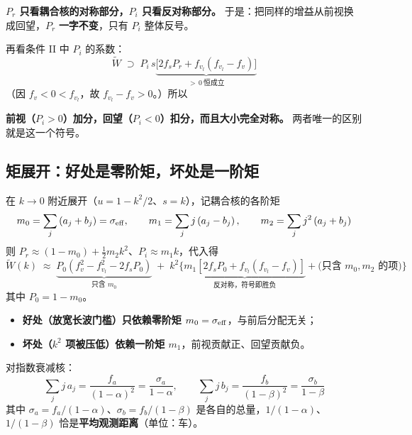 \documentclass[11pt,a4paper,openany]{book}
\numberwithin{equation}{chapter}
\numberwithin{figure}{chapter}
\numberwithin{table}{chapter}
\begin{document}
\textbf{$P_r$ 只看耦合核的对称部分，$P_i$ 只看反对称部分。} 于是：把同样的增益从前视换成回望，$P_r$ \textbf{一字不变}，只有 $P_i$ 整体反号。

再看条件 II 中 $P_i$ 的系数：
\begin{equation}
\widetilde W \;\supset\; P_i\,s\underbrace{\Big[2f_sP_r + f_{v_l}\left(f_{v_l}-f_v\right)\Big]}_{\textstyle >\,0\ \text{恒成立}}
\end{equation}
（因 $f_v<0<f_{v_l}$，故 $f_{v_l}-f_v>0$。）所以

\begin{tcolorbox}[notebox]
\textbf{前视（$P_i>0$）加分，回望（$P_i<0$）扣分，而且大小完全对称。} 两者唯一的区别就是这一个符号。
\end{tcolorbox}

\subsection{矩展开：好处是零阶矩，坏处是一阶矩}

在 $k\to0$ 附近展开（$u=1-k^2/2$、$s=k$），记耦合核的各阶矩
\begin{equation}
m_0 = \sum_j\left(a_j+b_j\right) = \sigma_{\rm eff},
\qquad
m_1 = \sum_j j\left(a_j-b_j\right),
\qquad
m_2 = \sum_j j^2\left(a_j+b_j\right)
\end{equation}
则 $P_r \approx \left(1-m_0\right) + \tfrac12 m_2k^2$、$P_i\approx m_1k$，代入得
\begin{equation}
\widetilde W(k) \;\approx\; \underbrace{P_0\left(f_v^2-f_{v_l}^2-2f_sP_0\right)}_{\text{只含 }m_0}
\;+\; k^2\Big\{\underbrace{m_1\left[2f_sP_0+f_{v_l}\left(f_{v_l}-f_v\right)\right]}_{\text{反对称，符号即胜负}} + \big(\text{只含 }m_0,m_2\text{ 的项}\big)\Big\}
\end{equation}
其中 $P_0=1-m_0$。

\begin{tcolorbox}[keybox,title=\textbf{结论}]
\begin{itemize}[leftmargin=1.2em,itemsep=3pt]
\item \textbf{好处（放宽长波门槛）只依赖零阶矩 $m_0=\sigma_{\rm eff}$}，与前后分配无关；
\item \textbf{坏处（$k^2$ 项被压低）依赖一阶矩 $m_1$}，前视贡献正、回望贡献负。
\end{itemize}
\end{tcolorbox}

对指数衰减核：
\begin{equation}
\sum_j j\,a_j = \frac{f_a}{\left(1-\alpha\right)^2} = \frac{\sigma_a}{1-\alpha},
\qquad
\sum_j j\,b_j = \frac{f_b}{\left(1-\beta\right)^2} = \frac{\sigma_b}{1-\beta}
\end{equation}
其中 $\sigma_a=f_a/(1-\alpha)$、$\sigma_b=f_b/(1-\beta)$ 是各自的总量，$1/(1-\alpha)$、$1/(1-\beta)$ 恰是\textbf{平均观测距离}（单位：车）。
\end{document}
